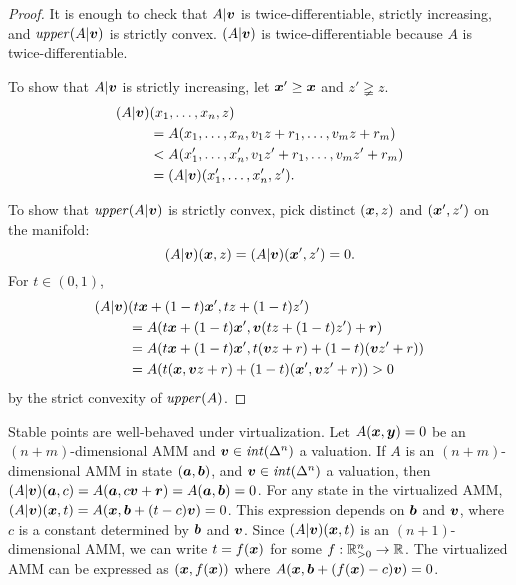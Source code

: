 \begin{proof}\sloppy
  It is enough to check that $A|{\boldsymbol v}$ is twice-differentiable,
  strictly increasing, and $\mathit{upper}(A|{\boldsymbol v})$ is strictly convex.
  $(A|{\boldsymbol v})$ is twice-differentiable because $A$ is twice-differentiable.

  To show that $A|{\boldsymbol v}$ is strictly increasing,
  let ${\boldsymbol x}' \geq {\boldsymbol x}$ and $z' \gneqq z$.
  \begin{equation*}
    \begin{aligned}
    (A|{\boldsymbol v})&(x_1,\ldots,x_n,z)\\
    &= A(x_1,\ldots,x_n, v_1 z + r_1, \ldots, v_m z + r_m)\\
    &< A(x_1',\ldots,x_n', v_1 z' + r_1, \ldots, v_m z' + r_m)\\
    &= (A|{\boldsymbol v})(x_1',\ldots,x_n',z').
    \end{aligned}
  \end{equation*}
  
  To show that $\mathit{upper}(A|{\boldsymbol v})$ is strictly convex,
  pick distinct $({\boldsymbol x},z)$ and $({\boldsymbol x}',z')$ on the manifold:
  \begin{equation*}
    (A|{\boldsymbol v})({\boldsymbol x},z) = (A|{\boldsymbol v})({\boldsymbol x}',z') = 0.
  \end{equation*}
  For $t \in (0,1)$,
  \begin{equation*}
    \begin{aligned}
    (A|{\boldsymbol v})&(t {\boldsymbol x} + (1-t) {\boldsymbol x}', t z + (1-t)z')\\
    &= A(t {\boldsymbol x} + (1-t) {\boldsymbol x}',{\boldsymbol v} (tz + (1-t)z') + {\boldsymbol r}) \\
    &=  A(t {\boldsymbol x} + (1-t) {\boldsymbol x}',t({\boldsymbol v} z + r)  + (1-t)({\boldsymbol v} z' + r)) \\
    &= A(t ({\boldsymbol x},{\boldsymbol v} z+ r) + (1-t) ({\boldsymbol x}',{\boldsymbol v} z' + r)) > 0
    \end{aligned}
  \end{equation*}
  by the strict convexity of $\mathit{upper}(A)$.
\end{proof}

Stable points are well-behaved under virtualization.
Let $A({\boldsymbol x},{\boldsymbol y}) = 0$ be an $(n+m)$-dimensional AMM
and ${\boldsymbol v} \in \mathit{int}(\Delta^n)$ a valuation.
If $A$ is an $(n+m)$-dimensional AMM in state $({\boldsymbol a},{\boldsymbol b})$,
and ${\boldsymbol v} \in \mathit{int}(\Delta^n)$ a valuation,
then $(A|{\boldsymbol v})({\boldsymbol a},c) = A({\boldsymbol a},c{\boldsymbol v} + {\boldsymbol r}) = A({\boldsymbol a},{\boldsymbol b}) = 0$.
For any state in the virtualized AMM,
$(A|{\boldsymbol v})({\boldsymbol x},t) = A({\boldsymbol x},{\boldsymbol b} + (t-c) {\boldsymbol v}) = 0$.
This expression depends on ${\boldsymbol b}$ and ${\boldsymbol v}$,
where $c$ is a constant determined by ${\boldsymbol b}$ and ${\boldsymbol v}$.
Since $(A|{\boldsymbol v})({\boldsymbol x},t)$ is an $(n+1)$-dimensional AMM,
we can write $t = f({\boldsymbol x})$ for some $f: \mathbb{R}_{>0}^n \to \mathbb{R}$.
The virtualized AMM can be expressed as $({\boldsymbol x},f({\boldsymbol x}))$
where $A({\boldsymbol x},{\boldsymbol b} + (f({\boldsymbol x}) - c){\boldsymbol v}) = 0$.

